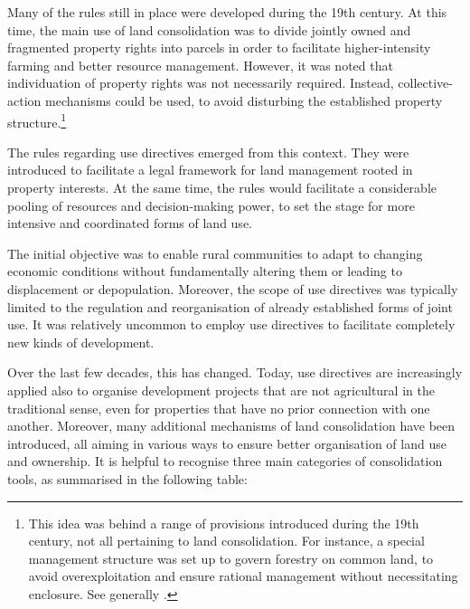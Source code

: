 Many of the rules still in place were developed during the 19th century. At this time, the main use of land consolidation was to divide jointly owned and fragmented property rights into parcels in order to facilitate higher-intensity farming and better resource management. However, it was noted that individuation of property rights was not necessarily required. Instead, collective-action mechanisms could be used, to avoid disturbing the established property structure.\footnote{This idea was behind a range of provisions introduced during the 19th century, not all pertaining to land consolidation. For instance, a special management structure was set up to govern forestry on common land, to avoid overexploitation and ensure rational management without necessitating enclosure. See generally \cite{stenseth10a}.}

The rules regarding use directives emerged from this context. They were introduced to facilitate a legal framework for land management rooted in property interests. At the same time, the rules would facilitate a considerable pooling of resources and decision-making power, to set the stage for more intensive and coordinated forms of land use.

The initial objective was to enable rural communities to adapt to changing economic conditions without fundamentally altering them or leading to displacement or depopulation. Moreover, the scope of use directives was typically limited to the regulation and reorganisation of already established forms of joint use. It was relatively uncommon to employ use directives to facilitate completely new kinds of development.

Over the last few decades, this has changed. Today, use directives are increasingly applied also to organise development projects that are not agricultural in the traditional sense, even for properties that have no prior connection with one another. Moreover, many additional mechanisms of land consolidation have been introduced, all aiming in various ways to ensure better organisation of land use and ownership. It is helpful to recognise three main categories of consolidation tools, as summarised in the following table:

